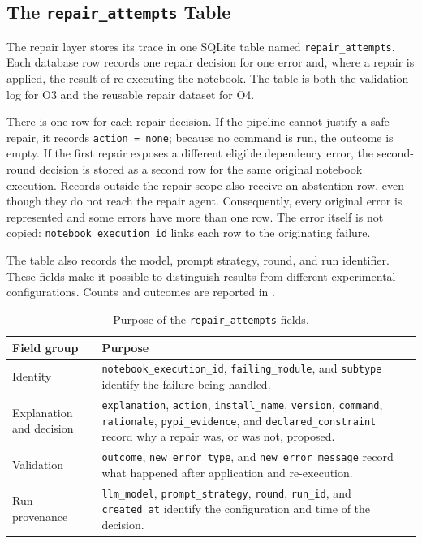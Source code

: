 \subsection{The \texttt{repair\_attempts} Table}
\label{subsec:repair-table}

The repair layer stores its trace in one SQLite table named
\texttt{repair\_attempts}. Each database row records one repair decision for
one error and, where a repair is applied, the result of re-executing the
notebook. The table is both the validation log for O3 and the reusable repair
dataset for O4.

There is one row for each repair decision. If the pipeline cannot justify a
safe repair, it records \texttt{action = none}; because no command is run,
the outcome is empty. If the first repair exposes a different eligible
dependency error, the second-round decision is stored as a second row for
the same original notebook execution. Records outside the repair scope also
receive an abstention row, even though they do not reach the repair agent.
Consequently, every original error is represented and some errors have more
than one row. The error itself is not copied: \texttt{notebook\_execution\_id}
links each row to the originating failure.

The table also records the model, prompt strategy, round, and run identifier.
These fields make it possible to distinguish results from different
experimental configurations. Counts and outcomes are reported in
.

\begin{table}[t]
\centering
\small
\begin{tabular}{p{}p{}}
\hline
\textbf{Field group} & \textbf{Purpose} \\
\hline
Identity & \texttt{notebook\_execution\_id}, \texttt{failing\_module}, and \texttt{subtype} identify the failure being handled. \\
Explanation and decision & \texttt{explanation}, \texttt{action}, \texttt{install\_name}, \texttt{version}, \texttt{command}, \texttt{rationale}, \texttt{pypi\_evidence}, and \texttt{declared\_constraint} record why a repair was, or was not, proposed. \\
Validation & \texttt{outcome}, \texttt{new\_error\_type}, and \texttt{new\_error\_message} record what happened after application and re-execution. \\
Run provenance & \texttt{llm\_model}, \texttt{prompt\_strategy}, \texttt{round}, \texttt{run\_id}, and \texttt{created\_at} identify the configuration and time of the decision. \\
\hline
\end{tabular}
\caption{Purpose of the \texttt{repair\_attempts} fields.}
\label{tab:repair-attempt-fields}
\end{table}

